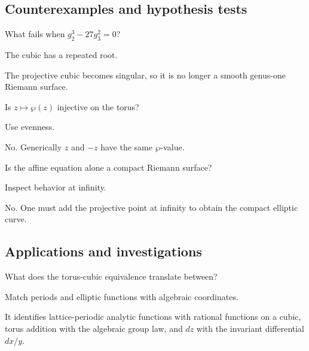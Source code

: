 \subsection*{Counterexamples and hypothesis tests}

\begin{exercise}\label{exr:iv31-expand-10}
What fails when \(g_2^3-27g_3^2=0\)?
\end{exercise}
\begin{hint}
The cubic has a repeated root.
\end{hint}
\begin{solution}
The projective cubic becomes singular, so it is no longer a smooth genus-one Riemann surface.
\end{solution}

\begin{exercise}\label{exr:iv31-expand-11}
Is \(z\mapsto\wp(z)\) injective on the torus?
\end{exercise}
\begin{hint}
Use evenness.
\end{hint}
\begin{solution}
No. Generically \(z\) and \(-z\) have the same \(\wp\)-value.
\end{solution}

\begin{exercise}\label{exr:iv31-expand-12}
Is the affine equation alone a compact Riemann surface?
\end{exercise}
\begin{hint}
Inspect behavior at infinity.
\end{hint}
\begin{solution}
No. One must add the projective point at infinity to obtain the compact elliptic curve.
\end{solution}

\subsection*{Applications and investigations}

\begin{exercise}\label{exr:iv31-expand-13}
What does the torus-cubic equivalence translate between?
\end{exercise}
\begin{hint}
Match periods and elliptic functions with algebraic coordinates.
\end{hint}
\begin{solution}
It identifies lattice-periodic analytic functions with rational functions on a cubic, torus addition with the algebraic group law, and \(dz\) with the invariant differential \(dx/y\).
\end{solution}

